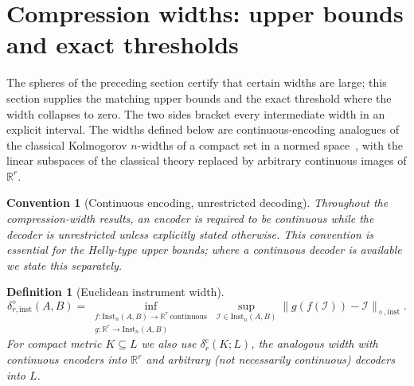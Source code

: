 \documentclass[11pt,a4paper]{article}
\newtheorem{definition}[theorem]{Definition}
\newtheorem{convention}[theorem]{Convention}
\newcommand{\Inst}{\mathrm{Inst}}
\begin{document}
\section{Compression widths: upper bounds and exact thresholds}
\label{sec:widths}

The spheres of the preceding section certify that certain widths are large; this section supplies the matching upper bounds and the exact threshold where the width collapses to zero. The two sides bracket every intermediate width in an explicit interval. The widths defined below are continuous-encoding analogues of the classical Kolmogorov $n$-widths of a compact set in a normed space~\cite{Pinkus1985}, with the linear subspaces of the classical theory replaced by arbitrary continuous images of $\mathbb R^r$.

\begin{convention}[Continuous encoding, unrestricted decoding]
\label{conv:decoder}
Throughout the compression-width results, an encoder is required to be continuous while the decoder is unrestricted unless explicitly stated otherwise. This convention is essential for the Helly-type upper bounds; where a continuous decoder is available we state this separately.
\end{convention}

\begin{definition}[Euclidean instrument width]
\label{def:width}
\[
\delta_{r,\mathrm{inst}}^{\diamond}(A,B)
=\inf_{\substack{f:\Inst_n(A,B)\to\mathbb R^r\ \text{continuous}\\ g:\mathbb R^r\to\Inst_n(A,B)}}
\sup_{\mathcal I\in\Inst_n(A,B)}
\|g(f(\mathcal I))-\mathcal I\|_{\diamond,\mathrm{inst}}.
\]
For compact metric $K\subseteq L$ we also use $\delta_r^{\mathrm c}(K;L)$, the analogous width with continuous encoders into $\mathbb R^r$ and arbitrary (not necessarily continuous) decoders into $L$.
\end{definition}
\end{document}
